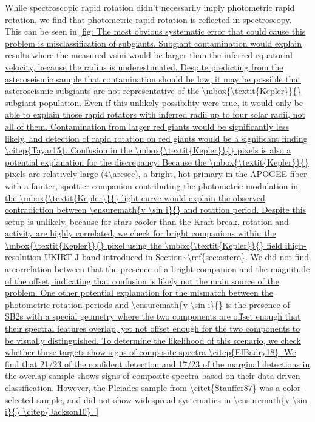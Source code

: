 \documentclass[manuscript]{aastex6}
\newcommand{\vsini}{\ensuremath{v \sin i}}
\newcommand{\Kepler}{\mbox{\textit{Kepler}}}
\begin{document}
While spectroscopic rapid rotation didn't necessarily imply photometric rapid
rotation, we find that photometric rapid rotation is reflected in spectroscopy.
This can be seen in \cref{fig:

The most obvious systematic error that could cause this problem is
misclassification of subgiants. Subgiant contamination would explain 
results where the measured vsini would be
larger than the inferred equatorial velocity, because the radius is
underestimated. Despite predicting from the asteroseismic sample that
contamination should be low, it may be possible that asteroseismic subgiants
are not representative of the \Kepler{} subgiant population. Even if this
unlikely possibility were true, it would only be able to explain those rapid
rotators with inferred radii up to four solar radii, not all of them.
Contamination from larger red giants would be significantly less likely, and
detection of rapid rotation on red giants would be a significant finding
\citep{Tayar15}.

Confusion in the \Kepler{} pixels is also a potential explanation for the
discrepancy. Because the \Kepler{} pixels are relatively large (4\arcsec), a 
bright, hot primary in the APOGEE fiber with a fainter, spottier companion 
contributing the photometric modulation in the
\Kepler{} light curve would explain the observed contradiction between
\vsini{} and rotation period. Despite this setup is unlikely, because for 
stars cooler than the Kraft break, rotation and activity are highly 
correlated, we check for bright companions
within the \Kepler{} pixel using the \Kepler{} field ihigh-resolution UKIRT
J-band introduced in Section~\ref{sec:astero}. We did not find a correlation 
between that the presence of a bright companion and the magnitude of the 
offset, indicating that confusion is likely not the main source of the 
problem.

One other potential explanation for the mismatch between the photometric
rotation periods and \vsini{} is the presence of SB2s with a special geometry
where the two components are offset enough that their spectral features
overlap, yet not offset enough for the two components to be visually
distinguished.  To determine the likelihood of this scenario, we check whether
these targets show signs of composite spectra \citep{ElBadry18}. We 
find that 21/23 of the confident detection and 17/23 of the marginal detections
in the overlap sample shows signs of composite spectra based on their
data-driven classification. However, the Pleiades sample from
\citet{Stauffer87} was a color-selected sample, and did not show widespread
systematics in \vsini{} \citep{Jackson10}.

}
\end{document}
